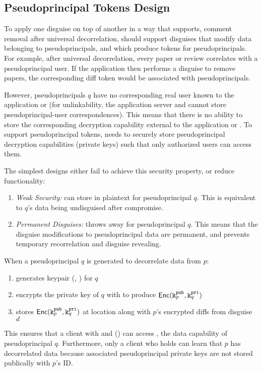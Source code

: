 \subsection{Pseudoprincipal Tokens Design}

To apply one disguise on top of another in a way that supports, \eg comment removal after universal
decorrelation, \sys should support disguises that modify data belonging to pseudoprincipals, and which
produce tokens for pseudoprincipals.
%
For example, after universal decorrelation, every paper or review correlates with a pseudoprincipal
user. If the application then performs a disguise to remove papers, the corresponding diff token 
would be associated with pseudoprincipals.

However, pseudoprincipals $q$ have no corresponding real user known to the application or \sys (for
unlinkability, the application server and \sys cannot store pseudoprincipal-user correspondences). 
This means that there is no ability to store the corresponding decryption capability 
external to the application or \sys.
To support pseudoprincipal tokens, \sys needs to securely store pseudoprincipal decryption
capabilities (private keys) such that only authorized users can access them.

The simplest designs either fail to achieve this security property, or reduce functionality:
\begin{enumerate}
    \item \emph{Weak Security:} \sys can store  in plaintext for pseudoprincipal $q$. 
        This is equivalent to $q$'s data being undisguised after compromise.  
    \item \emph{Permanent Disguises:} \sys throws away  for pseudoprincipal $q$. This means that the
            disguise modifications to pseudoprincipal data are permanent, and prevents temporary
            recorrelation and disguise revealing.
\end{enumerate}

When a pseudoprincipal $q$ is generated to decorrelate data from $p$: 
\begin{enumerate}
    \item \sys generates keypair (, ) for $q$
    \item encrypts the private key of $q$ with  to produce $\mathsf{Enc}(\texttt{\ensuremath{\texttt{k}^{\text{pub}}_{p}}}, \texttt{\ensuremath{\texttt{k}^{\text{pri}}_{q}}})$
    \item stores $\mathsf{Enc}(\texttt{\ensuremath{\texttt{k}^{\text{pub}}_{p}}}, \texttt{\ensuremath{\texttt{k}^{\text{pri}}_{q}}})$ at location  along with $p$'s encrypted diffs from disguise $d$
\end{enumerate}
This ensures that a client with  and  () can access , the data
capability of pseudoprincipal $q$.  Furthermore, only a client who holds  can learn
that $p$ has decorrelated data because associated pseudoprincipal private keys are not stored
publically with $p$'s ID.

